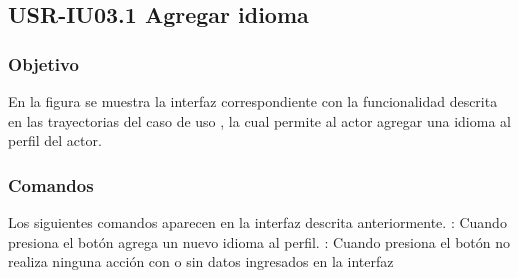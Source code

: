 \clearpage
\subsection{USR-IU03.1 Agregar idioma}

\subsubsection{Objetivo}
En la figura  se muestra la interfaz correspondiente con la funcionalidad descrita en las
trayectorias del caso de uso  , la cual permite al actor agregar una idioma al perfil del actor.

\subsubsection{Comandos}
Los siguientes comandos aparecen en la interfaz descrita anteriormente.
\Titem {} : Cuando presiona el botón agrega un nuevo idioma al perfil.
\Titem {} : Cuando presiona el botón no realiza ninguna acción con o sin datos ingresados en la interfaz


\clearpage
